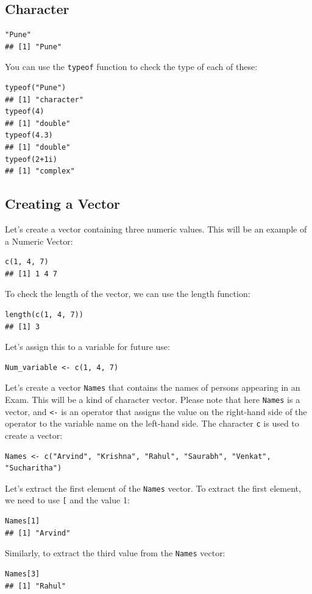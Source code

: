 \documentclass[12pt]{book}
\begin{document}
\subsection{Character}
\begin{verbatim}
"Pune"
## [1] "Pune"
\end{verbatim}

You can use the \texttt{typeof} function to check the type of each of these:
\begin{verbatim}
typeof("Pune")
## [1] "character"
typeof(4)
## [1] "double"
typeof(4.3)
## [1] "double"
typeof(2+1i) 
## [1] "complex"
\end{verbatim}

\subsection{Creating a Vector}
Let's create a vector containing three numeric values. This will be an example of a Numeric Vector:
\begin{verbatim}
c(1, 4, 7)
## [1] 1 4 7
\end{verbatim}

To check the length of the vector, we can use the length function:
\begin{verbatim}
length(c(1, 4, 7))
## [1] 3
\end{verbatim}

Let's assign this to a variable for future use:
\begin{verbatim}
Num_variable <- c(1, 4, 7)
\end{verbatim}

Let’s create a vector \texttt{Names} that contains the names of persons appearing in an Exam. This will be a kind of character vector. Please note that here \texttt{Names} is a vector, and \texttt{<-} is an operator that assigns the value on the right-hand side of the operator to the variable name on the left-hand side. The character \texttt{c} is used to create a vector:
\begin{verbatim}
Names <- c("Arvind", "Krishna", "Rahul", "Saurabh", "Venkat", "Sucharitha")
\end{verbatim}

Let's extract the first element of the \texttt{Names} vector. To extract the first element, we need to use \texttt{[} and the value 1:
\begin{verbatim}
Names[1]
## [1] "Arvind"
\end{verbatim}

Similarly, to extract the third value from the \texttt{Names} vector:
\begin{verbatim}
Names[3]
## [1] "Rahul"
\end{verbatim}
\end{document}
